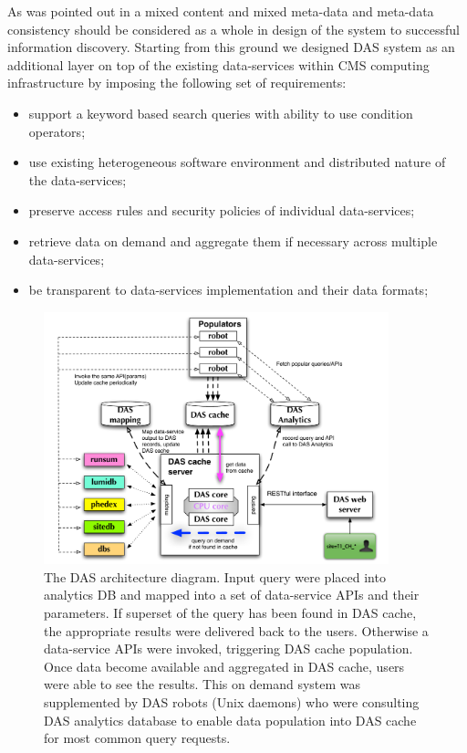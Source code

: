 \documentclass[1p,times]{elsarticle}
\begin{document}
As was pointed out in \cite{Arms} a mixed content and 
mixed meta-data and meta-data consistency should be considered as a whole in design 
of the system to successful information discovery. 
Starting from this ground we designed DAS system as an
additional layer on top of the existing data-services
within CMS computing infrastructure by imposing the following set of requirements:
\begin{itemize}
\item support a keyword based search queries with ability to use condition operators;
\item use existing heterogeneous software environment and distributed nature of the data-services;
\item preserve access rules and security policies of individual data-services;
\item retrieve data on demand and aggregate them if necessary across
multiple data-services;
\item be transparent to data-services implementation and their data formats;
\end{itemize}
\begin{figure}[htb]
\centering
\includegraphics[width=100mm]{DAS_Cache_and_Analytics.pdf}
\caption{
The DAS architecture diagram. 
Input query were placed into analytics DB and mapped into a set of
data-service APIs and their parameters. If superset of the query has been
found in DAS cache, the appropriate results were delivered back to the users.
Otherwise a data-service APIs were invoked, triggering DAS cache population. 
Once data become available and aggregated in DAS cache, users were able 
to see the results. This on demand system was supplemented by DAS robots 
(Unix daemons) who were consulting DAS analytics database to enable data 
population into DAS cache for most common query requests.
}
\label{DAS_cache}
\end{figure}
\end{document}
